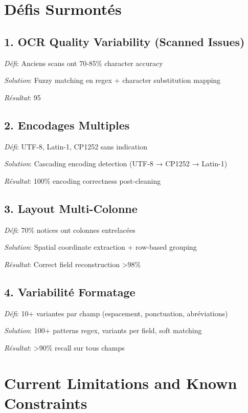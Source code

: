 \documentclass[12pt,a4paper]{report}
\begin{document}
\section{Défis Surmontés}

\subsection{1. OCR Quality Variability (Scanned Issues)}

\textit{Défi}: Anciens scans ont 70-85\% character accuracy

\textit{Solution}: Fuzzy matching en regex + character substitution mapping

\textit{Résultat}: 95%

\subsection{2. Encodages Multiples}

\textit{Défi}: UTF-8, Latin-1, CP1252 sans indication

\textit{Solution}: Cascading encoding detection (UTF-8 → CP1252 → Latin-1)

\textit{Résultat}: 100\% encoding correctness post-cleaning

\subsection{3. Layout Multi-Colonne}

\textit{Défi}: 70\% notices ont colonnes entrelacées

\textit{Solution}: Spatial coordinate extraction + row-based grouping

\textit{Résultat}: Correct field reconstruction >98\%

\subsection{4. Variabilité Formatage}

\textit{Défi}: 10+ variantes par champ (espacement, ponctuation, abréviations)

\textit{Solution}: 100+ patterns regex, variants per field, soft matching

\textit{Résultat}: >90\% recall sur tous champs

\section{Current Limitations and Known Constraints}
\end{document}
